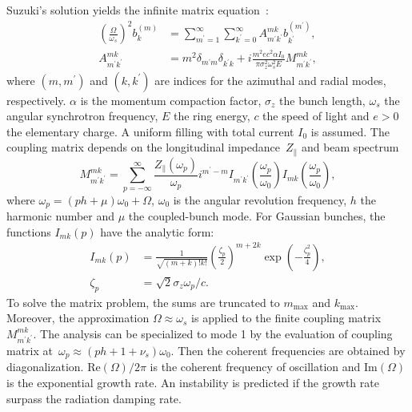 \documentclass[a4paper,
               ]{jacow}
\begin{document}
Suzuki's solution yields the infinite matrix equation~\cite{Suzuki1983}:
\begin{align}
\left(\frac{\Omega}{\omega_s}\right)^2 b_{k}^{(m)} &= \sum_{m^\prime=1}^{\infty} \sum_{k^\prime = 0}^{\infty} A_{m^\prime k^\prime}^{m k} b_{k^\prime}^{(m^\prime)}, \\
    A_{m^\prime k^\prime}^{m k} &= m^2 \delta_{m^\prime m}\delta_{k^\prime k} + i \frac{m^2 ec^2 \alpha I_0}{\pi \sigma_z^2 \omega_s^2 E}  M_{m^\prime k^\prime}^{m k},
\end{align}
where $(m, m^\prime)$ and $(k, k^\prime)$ are indices for the azimuthal and radial modes, respectively. $\alpha$ is the momentum compaction factor, $\sigma_z$ the bunch length, $\omega_s$ the angular synchrotron frequency, $E$ the ring energy, $c$ the speed of light and $e>0$ the elementary charge. A uniform filling with total current $I_0$ is assumed. The coupling matrix depends on the longitudinal impedance~$Z_{\parallel}$ and beam spectrum
\begin{equation}
   M_{m^\prime k^\prime}^{m k} = \sum_{p=-\infty}^{\infty} \frac{Z_{\parallel}(\omega_p)}{\omega_p} i^{m^\prime-m} I_{m^\prime k^\prime}\left(\frac{\omega_p}{\omega_0}\right) I_{m k}\left(\frac{\omega_p}{\omega_0}\right),
\end{equation}
where $\omega_p = (ph + \mu)\omega_0 + \Omega$, $\omega_0$ is the angular revolution frequency, $h$ the harmonic number and $\mu$ the coupled-bunch mode. For Gaussian bunches, the functions $I_{m k}(p)$ have the analytic form:
\begin{align}
    I_{m k}(p) &= \frac{1}{\sqrt{(m+k)!k!}} \left(\frac{\zeta_p}{2}\right)^{m+2k} \exp\left({-\frac{\zeta_p^2}{4}}\right),\\\zeta_p &= \sqrt{2}\sigma_z \omega_p/c. \nonumber
\end{align}
To solve the matrix problem, the sums are truncated to $m_\mathrm{max}$ and $k_\mathrm{max}$. Moreover, the approximation $\Omega \approx \omega_s$ is applied to the finite coupling matrix $M_{m^\prime k^\prime}^{m k}$. The analysis can be specialized to mode 1 by the evaluation of coupling matrix at~$\omega_p \approx (ph + 1 + \nu_s)\omega_0$. Then the coherent frequencies are obtained by diagonalization. $\mathrm{Re}(\Omega)\slash 2\pi$ is the coherent frequency of oscillation and $\mathrm{Im}(\Omega)$ is the exponential growth rate. An instability is predicted if the growth rate surpass the radiation damping rate.
\end{document}
